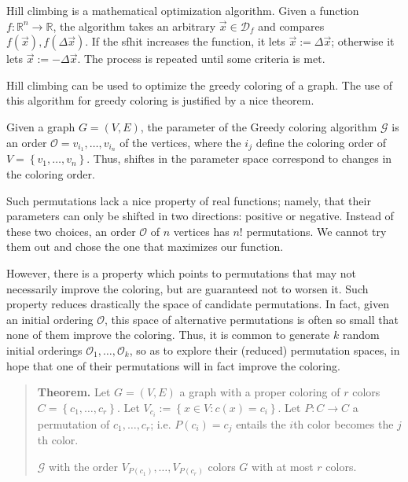 \documentclass[a4paper, 12pt]{article}
\begin{document}
Hill climbing is a mathematical optimization algorithm. Given a function $f :
\mathbb{R}^n \to \mathbb{R}$, the algorithm takes an arbitrary
$\overrightarrow{x} \in \mathcal{D}_f$ and compares $f(\overrightarrow{x}),
f(\Delta \overrightarrow{x})$. If the sfhit increases the
function, it lets $\overrightarrow{x} := \Delta\overrightarrow{x}$; otherwise 
it lets $\overrightarrow{x} := -\Delta\overrightarrow{x}$. The process 
is repeated until some criteria is met.

Hill climbing can be used to optimize the greedy coloring of a graph. The use
of this algorithm for greedy coloring is justified by a nice theorem.

Given a graph $G = (V, E)$, the parameter of the Greedy coloring algorithm
$\mathcal{G}$ is an order $\mathcal{O} = v_{i_1}, \ldots, v_{i_n}$ of the
vertices, where the $i_j$ define the coloring order of $V = \left\{ v_1,
\ldots, v_n \right\} $. Thus, shiftes in the parameter space correspond to
changes in the coloring order. 

Such permutations lack a nice property of real functions; namely, that their
parameters can only be shifted in two directions: positive or negative. Instead
of these two choices, an order $\mathcal{O}$ of $n$ vertices has $n!$
permutations. We cannot try them out and chose the one that maximizes our
function.

However, there is a property which points to permutations that may not
necessarily improve the coloring, but are guaranteed not to worsen it. Such
property reduces drastically the space of candidate permutations. In fact,
given an initial ordering $\mathcal{O}$, this space of alternative permutations
is often so small that none of them improve the coloring. Thus, it is common to
generate $k$ random initial orderings $\mathcal{O}_1, \ldots, \mathcal{O}_k$,
so as to explore their (reduced) permutation spaces, in hope that one of their
permutations will in fact improve the coloring. 

\begin{quote}
    \textbf{Theorem.} Let $G = (V, E)$ a graph with a proper coloring of $r$
    colors $C = \left\{ c_1, \ldots, c_r \right\} $. Let $V_{c_i} := \left\{ x\in V
    : c(x) =c_i \right\} $. Let $P : C \to C $ a permutation of $c_1, \ldots, c_r$;
    i.e. $P(c_i) = c_j$ entails the $i$th color becomes the $j$th color.
    
    $\mathcal{G}$ with the order $V_{P(c_1)}, \ldots, V_{P(c_r)}$ colors 
    $G$ with at most $r$ colors.
\end{quote}
\end{document}
